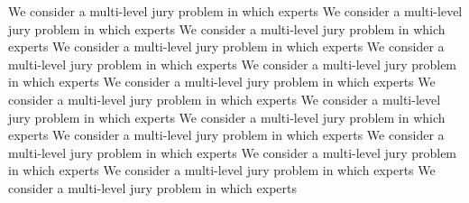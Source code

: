 \documentclass[letterpaper]{article} %
\begin{document}
We consider a multi-level jury problem in which experts
We consider a multi-level jury problem in which experts
We consider a multi-level jury problem in which experts
We consider a multi-level jury problem in which experts
We consider a multi-level jury problem in which experts
We consider a multi-level jury problem in which experts
We consider a multi-level jury problem in which experts
We consider a multi-level jury problem in which experts
We consider a multi-level jury problem in which experts
We consider a multi-level jury problem in which experts
We consider a multi-level jury problem in which experts
We consider a multi-level jury problem in which experts
We consider a multi-level jury problem in which experts
We consider a multi-level jury problem in which experts
We consider a multi-level jury problem in which experts
\clearpage

{}
% 

\end{document}
